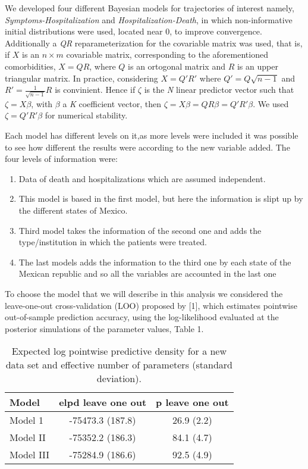 \documentclass[10pt,letterpaper]{article}
\begin{document}
We developed four different Bayesian models for trajectories of interest
namely, \emph{Symptoms-Hospitalization} and
\emph{Hospitalization-Death}, in which non-informative initial
distributions were used, located near \(0\), to improve convergence.
Additionally a \textit{QR} reparameterization for the covariable matrix
was used, that is, if \(X\) is an \(n \times m\) covariable matrix,
corresponding to the aforementioned comorbidities, \(X=QR\), where \(Q\)
is an ortogonal matrix and \(R\) is an upper triangular matrix. In
practice, considering \(X=Q'R'\) where \(Q'=Q\sqrt{n-1}\) and
\(R'=\frac{1}{\sqrt{n-1}}R\) is convinient. Hence if \(\zeta\) is the
\textit{N} linear predictor vector such that \(\zeta=X\beta\), with
\(\beta\) a \textit{K} coefficient vector, then
\(\zeta=X\beta=QR\beta=Q'R'\beta\). We used \(\zeta=Q'R'\beta\) for
numerical stability.

Each model has different levels on it,as more levels were included it
was possible to see how different the results were according to the new
variable added. The four levels of information were:

\begin{enumerate}
  \item Data of death and hospitalizations which are assumed independent.
  \item This model is based in the first model, but here the information is slipt up by the different states of Mexico.
  \item Third model takes the information of the second one and adds the type/institution in which the patients were treated.
  \item The last models adds the information to the third one by each state of the Mexican republic and so all the variables are accounted in the last one
\end{enumerate}

To choose the model that we will describe in this analysis we considered
the leave-one-out cross-validation (LOO) proposed by {[}1{]}, which
estimates pointwise out-of-sample prediction accuracy, using the
log-likelihood evaluated at the posterior simulations of the parameter
values, Table 1.

\begin{table}[!htb]
\centering
\begin{tabular}{lcc}
\hline
{\textbf{Model}} & {\textbf{elpd leave one out}} & {\textbf{p leave one out}} \\
\hline Model 1  &  -75473.3 (187.8) & 26.9 (2.2) \\
Model II          &   -75352.2 (186.3) &  84.1 (4.7)\\
Model III         &    -75284.9 (186.6) &  92.5 (4.9)  \\
\hline
\end{tabular}
\caption{\label{tab:gof} Expected log pointwise predictive density for a new data set and effective number of parameters (standard deviation).}
\end{table}
\end{document}

